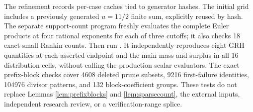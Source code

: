 \documentclass[11pt]{article}
\begin{document}
The refinement records
per-case caches tied to generator hashes. The initial grid includes a
previously generated $u=11/2$ finite sum, explicitly reused by hash.
The separate support-count program
 freshly evaluates
the complete Euler products at four rational exponents for each of three
cutoffs; it also checks 18 exact small Rankin counts.
Then run .
It independently reproduces eight GRH quantities at each asserted endpoint
and the main mass and surplus in all 16 distribution cells, without calling
the production scalar evaluators. The exact prefix-block checks cover
4608 deleted prime subsets, 9216 first-failure identities, 104976 divisor
patterns, and 132 block-coefficient groups. These tests do not replace
Lemmas \ref{lem:prefixblocks} and \ref{lem:sparsecount}, the external inputs,
independent research review, or a verification-range splice.
\end{document}
